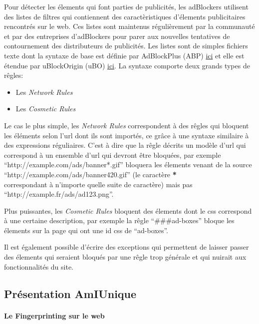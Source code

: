\documentclass[oneside,a4paper,12pt]{article}
\begin{document}
Pour détecter les élements qui font parties de publicités, les adBlockers utilisent des listes de filtres qui contiennent des caractèristiques d'élements publicitaires rencontrés sur le web. Ces listes sont maintenus régulièrement par la communauté et par des entreprises d'adBlockers pour parer aux nouvelles tentatives de contournement des distributeurs de publicités. Les listes sont de simples fichiers texte dont la syntaxe de base est définie par AdBlockPlus (ABP) \href{https://help.eyeo.com/en/adblockplus/how-to-write-filters#allowlist}{ici} et elle est étendue par uBlockOrigin (uBO) \href{https://github.com/gorhill/uBlock/wiki/Static-filter-syntax#extended-syntax}{ici}. La syntaxe comporte deux grands types de rêgles: 
\begin{itemize}
\item Les \textit{Network Rules}
\item Les \textit{Cosmetic Rules}
\end{itemize}
Le cas le plus simple, les \textit{Network Rules} correspondent à des rêgles qui bloquent les éléments selon l'url dont ils sont importés, ce grâce à une syntaxe similaire à des expressions réguliaires. C'est à dire que la rêgle décrits un modèle d'url qui correspond à un ensemble d'url qui devront être bloquées, par exemple ``http://example.com/ads/banner*.gif'' bloquera les élements venant de la source ``http://example.com/ads/banner420.gif'' (le caractère \textbf{*}\\ correspondant à n'importe quelle suite de caractère) mais pas \\``http://example.fr/ads/ad123.png''.

Plus puissantes, les \textit{Cosmetic Rules} bloquent des élements dont le css correspond à une certaine description, par exemple la rêgle ``\#\#\#ad-boxes'' bloque les élements sur la page qui ont une id css de ``ad-boxes''.

Il est également possible d'écrire des exceptions qui permettent de laisser passer des élements qui seraient bloqués par une rêgle trop générale et qui nuirait aux fonctionnalités du site.

\subsection{Présentation AmIUnique}\label{Intro:amiunique}

\paragraph*{Le Fingerprinting sur le web}
\end{document}
